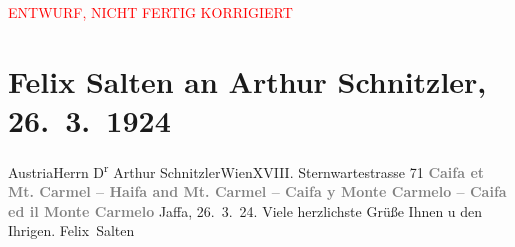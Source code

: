 
\begin{center}
            \textcolor{red}{ENTWURF, NICHT FERTIG KORRIGIERT}
                      \end{center}
            
         \renewcommand{\erwaehnteOrte}{Orte: Jaffa, Mount Carmel, Ramla, Sternwartestraße, Wien, Österreich}
         \renewcommand{\erwaehnteWerke}{}
               \section[Felix Salten an Arthur Schnitzler, 26. 3. 1924]{ Felix Salten an Arthur Schnitzler, 26. 3. 1924}\nopagebreak{}\rehead{ }\begin{ledgroupsized}[t]{13cm}\normalsize\beginnumbering \toendnotes[C]{\smallbreak\pagebreak[2]} 
\pstart{}{\pb}Austria\pend{}\pstart{}Herrn D\textsuperscript{r} Arthur Schnitzler\pend{}\pstart{}Wien\pend{}\pstart{}XVIII. Sternwartestrasse 71\pend{}{\bigskip}\pstart
           \noindent{}{\pb}\textcolor{gray}{\textbf{Caifa et Mt. Carmel – Haifa and Mt. Carmel – Caifa y
                        Monte Carmelo – Caifa ed il Monte Carmelo}}\pend
           \pstart
           Jaffa, 26. 3. 24. \pend
           \pstart
           Viele herzlichste Grüße Ihnen u den Ihrigen.\pend
           \pstart \spacefill\mbox{Felix Salten}\pend{}
         
         \endnumbering{}\end{ledgroupsized}\begin{anhang}\end{anhang}\newcommand{\dateiname}{L03583}\newcommand{\titel}{Felix Salten an Arthur Schnitzler, 26. 3. 1924}\newcommand{\editorInnen}{Martin Anton Müller und Laura Untner}
      